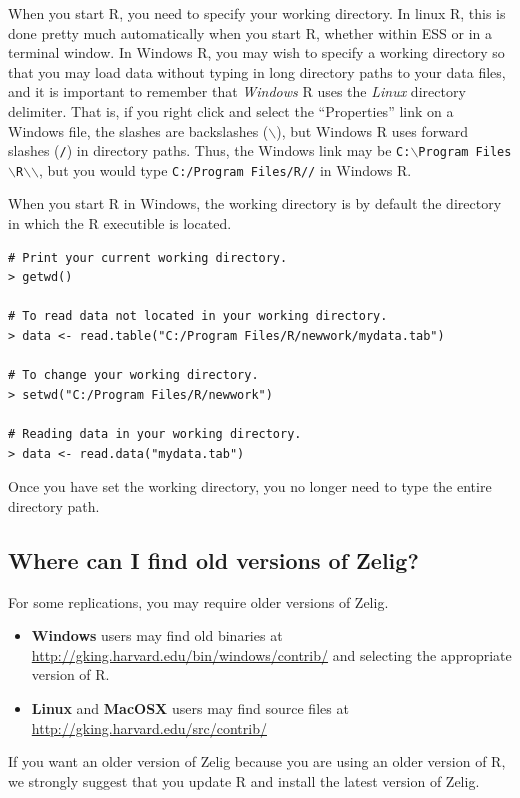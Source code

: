 When you start R, you need to specify your working directory.  In
linux R, this is done pretty much automatically when you start R,
whether within ESS or in a terminal window.  In Windows R, you may
wish to specify a working directory so that you may load data without
typing in long directory paths to your data files, and it is important
to remember that \emph{Windows} R uses the \emph{Linux} directory
delimiter. That is, if you right click and select the ``Properties''
link on a Windows file, the slashes are backslashes ($\backslash$), but Windows R 
uses forward slashes ({\tt /}) in directory paths.  Thus, the Windows
link may be {\tt C:$\backslash$Program Files$\backslash$R$\backslash$\rwvers$\backslash$}, but you would type
 {\tt C:/Program Files/R/\rwvers/} in Windows R.

When you start R in Windows, the working directory is by default the
directory in which the R executible is located.
\begin{verbatim}
# Print your current working directory.  
> getwd()                                    

# To read data not located in your working directory. 
> data <- read.table("C:/Program Files/R/newwork/mydata.tab")

# To change your working directory.  
> setwd("C:/Program Files/R/newwork")

# Reading data in your working directory.
> data <- read.data("mydata.tab")
\end{verbatim}
Once you have set the working directory, you no longer need to type
the entire directory path.  

\subsection*{Where can I find old versions of Zelig?} 

For some replications, you may require older versions of Zelig. 
\begin{itemize}
\item {\bf Windows} users may find old binaries at
\url{http://gking.harvard.edu/bin/windows/contrib/}
and selecting the appropriate version of R.

\item {\bf Linux} and {\bf MacOSX} users may find source files at
\url{http://gking.harvard.edu/src/contrib/} 
\end{itemize}  
If you want an older version of Zelig because you are using an older
version of R, we strongly suggest that you update R and install the
latest version of Zelig.  

